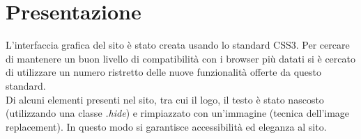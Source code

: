 \section{Presentazione}
L'interfaccia grafica del sito è stato creata usando lo standard CSS3.
Per cercare di mantenere un buon livello di compatibilità con i browser più
datati si è cercato di utilizzare un numero ristretto delle nuove funzionalità offerte da
questo standard.\\
Di alcuni elementi presenti nel sito, tra cui il logo, il testo è stato nascosto (utilizzando una classe \textit{.hide}) e rimpiazzato con un'immagine (tecnica dell'image replacement).
In questo modo si garantisce accessibilità ed eleganza al sito.


\newpage